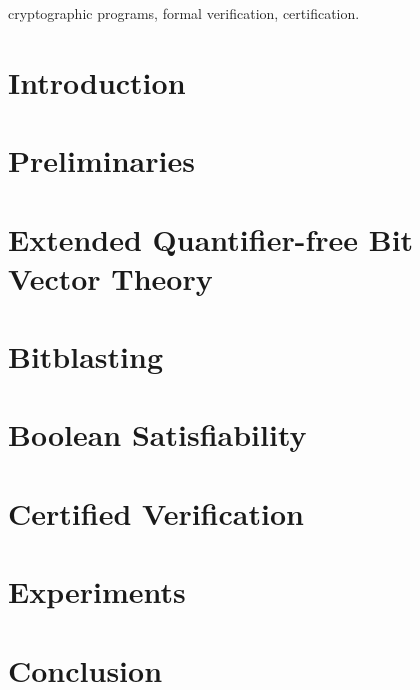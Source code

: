 \documentclass[10pt,conference,letterpaper]{IEEEtran}
\begin{document}
\begin{IEEEkeywords}
  cryptographic programs, formal verification, certification.
\end{IEEEkeywords}

\section{Introduction}
\label{section:introduction}

\section{Preliminaries}
\label{section:preliminaries}

\section{\cryptoline}
\label{section:cryptoline}



\section{Extended Quantifier-free Bit Vector Theory}
\label{section:qfbv-semantics}

\section{Bitblasting}
\label{section:bitblasting}

\section{Boolean Satisfiability}
\label{section:sat}

\section{Certified Verification}
\label{section:certified-verification}

\section{Experiments}
\label{section:experiments}

\section{Conclusion}
\label{section:conclusion}



\end{document}
